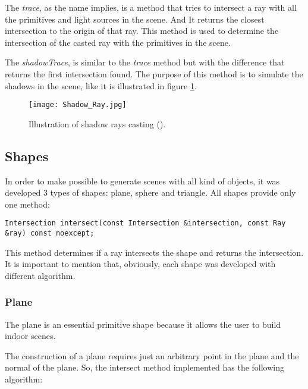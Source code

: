 \par
The \textit{trace}, as the name implies, is a method that tries to intersect a ray with all the primitives and light sources in the scene.
And It returns the closest intersection to the origin of that ray.
This method is used to determine the intersection of the casted ray with the primitives in the scene.

\par
The \textit{shadowTrace}, is similar to the \textit{trace} method but with the difference that returns the first intersection found.
The purpose of this method is to simulate the shadows in the scene, like it is illustrated in figure \ref{Illustration of shadow rays casting.}.

\begin{figure}[H]
	\centering
	\caption{Illustration of shadow rays casting (\cite{ShadowRays}).}
	\label{Illustration of shadow rays casting.}
	\texttt{[image: Shadow\_Ray.jpg]}
\end{figure}


\subsection{Shapes}

\par
In order to make possible to generate scenes with all kind of objects, it was developed 3 types of shapes: plane, sphere and triangle.
All shapes provide only one method:
\begin{lstlisting}
Intersection intersect(const Intersection &intersection, const Ray &ray) const noexcept;
\end{lstlisting}
This method determines if a ray intersects the shape and returns the intersection.
It is important to mention that, obviously, each shape was developed with different algorithm.

\subsubsection{Plane}

\par
The plane is an essential primitive shape because it allows the user to build indoor scenes.

\par
The construction of a plane requires just an arbitrary point in the plane and the normal of the plane.
So, the intersect method implemented has the following algorithm:

